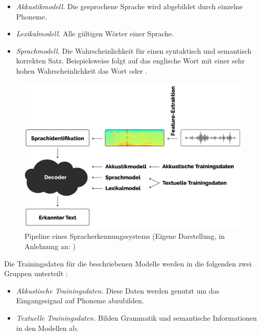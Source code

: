 \begin{itemize}
    \item \textit{Akkustikmodell.} Die gesprochene Sprache wird abgebildet durch einzelne Phoneme.
    \item \textit{Lexikalmodell.} Alle gültigen Wörter einer Sprache.
    \item \textit{Sprachmodell.} Die Wahrscheinlichkeit für einen syntaktisch und semantisch korrekten Satz.
            Beispielsweise folgt auf das englische Wort \grqq{} mit einer sehr hohen Wahrscheinlichkeit das Wort \grqq{} oder
        \grqq{}.
\end{itemize}

\begin{figure}[h!]
    \centering
    \includegraphics[width=1\linewidth]{images/pipeline}
    \caption{Pipeline eines Spracherkennungssystems (Eigene Darstellung, in Anlehnung an: \cite{Tom.2016}) }%
    \label{fig:pipeline}
\end{figure}

Die Trainingsdaten für die beschriebenen Modelle werden in die folgenden zwei Gruppen unterteilt \cite{Tom.2016}:

\begin{itemize}
    \item \textit{Akkustische Trainingsdaten.} Diese Daten werden genutzt um das Eingangssignal auf Phoneme abzubilden.
    \item \textit{Textuelle Trainingsdaten.} Bilden Grammatik und semantische Informationen in den Modellen ab.
\end{itemize}

